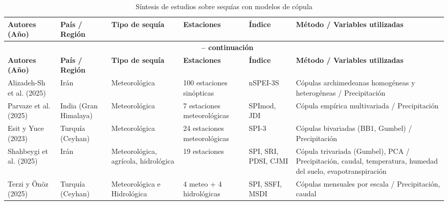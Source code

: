 \begin{longtable}{p{4cm}p{2.5cm}p{3.5cm}p{3cm}p{2.5cm}p{4cm}}
    \caption{Síntesis de estudios sobre sequías con modelos de cópula}
    \label{tab:copula_studies} \\
    \toprule
    \textbf{Autores (Año)} & \textbf{País / Región} & \textbf{Tipo de sequía} & \textbf{Estaciones} & \textbf{Índice} & \textbf{Método / Variables utilizadas} \\
    \midrule
    \endfirsthead
    
    \multicolumn{6}{c}{{\bfseries \tablename\ \thetable{} -- continuación}} \\
    \toprule
    \textbf{Autores (Año)} & \textbf{País / Región} & \textbf{Tipo de sequía} & \textbf{Estaciones} & \textbf{Índice} & \textbf{Método / Variables utilizadas} \\
    \midrule
    \endhead
    
    \bottomrule
    \endfoot
    
    Alizadeh-Sh et al. (2025) & Irán & Meteorológica & 100 estaciones sinópticas & nSPEI-3S & Cópulas archimedeanas homogéneas y heterogéneas / Precipitación \\
    Parvaze et al. (2025) & India (Gran Himalaya) & Meteorológica & 7 estaciones meteorológicas & SPImod, JDI & Cópula empírica multivariada / Precipitación \\
    Esit y Yuce (2023) & Turquía (Ceyhan) & Meteorológica & 24 estaciones meteorológicas & SPI-3 & Cópulas bivariadas (BB1, Gumbel) / Precipitación \\
    Shahbeygi et al. (2025) & Irán & Meteorológica, agrícola, hidrológica & 19 estaciones & SPI, SRI, PDSI, CJMI & Cópula trivariada (Gumbel), PCA / Precipitación, caudal, temperatura, humedad del suelo, evapotranspiración \\
    Terzi y Önöz (2025) & Turquía (Ceyhan) & Meteorológica e Hidrológica & 4 meteo + 4 hidrológicas & SPI, SSFI, MSDI & Cópulas mensuales por escala / Precipitación, caudal \\
    \end{longtable}
    

